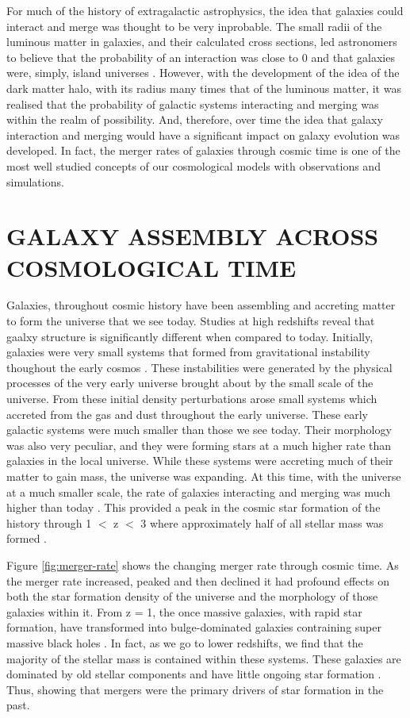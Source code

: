 For much of the history of extragalactic astrophysics, the idea that galaxies could interact and merge was thought to be very inprobable. The small radii of the luminous matter in galaxies, and their calculated cross sections, led astronomers to believe that the probability of an interaction was close to 0 and that galaxies were, simply, island universes  \citep{1926ApJ....64..321H}. However, with the development of the idea of the dark matter halo, with its radius many times that of the luminous matter, it was realised that the probability of galactic systems interacting and merging was within the realm of possibility. And, therefore, over time the idea that galaxy interaction and merging would have a significant impact on galaxy evolution was developed. In fact, the merger rates of galaxies through cosmic time is one of the most well studied concepts of our cosmological models with observations and simulations.

\section{GALAXY ASSEMBLY ACROSS COSMOLOGICAL TIME}
\noindent Galaxies, throughout cosmic history have been assembling and accreting matter to form the universe that we see today. Studies at high redshifts reveal that gaalxy structure is significantly different when compared to today. Initially, galaxies were very small systems that formed from gravitational instability thoughout the early cosmos \citep{1993MNRAS.262..627L}. These instabilities were generated by the physical processes of the very early universe brought about by the small scale of the universe. From these initial density perturbations arose small systems which accreted from the gas and dust throughout the early universe. These early galactic systems were much smaller than those we see today. Their morphology was also very peculiar, and they were forming stars at a much higher rate than galaxies in the local universe. While these systems were accreting much of their matter to gain mass, the universe was expanding. At this time, with the universe at a much smaller scale, the rate of galaxies interacting and merging was much higher than today \citep{2010ApJ...715..202H, 2011ApJ...742..103L}. This provided a peak in the cosmic star formation of the history through 1 $<$ z $<$ 3 where approximately half of all stellar mass was formed \citep{2005ApJ...625..621B}.

Figure \ref{fig:merger-rate} shows the changing merger rate through cosmic time. As the merger rate increased, peaked and then declined it had profound effects on both the star formation density of the universe and the morphology of those galaxies within it. From z = 1, the once massive galaxies, with rapid star formation, have transformed into bulge-dominated galaxies contraining super massive black holes \citep{2007ApJ...654..858B}. In fact, as we go to lower redshifts, we find that the majority of the stellar mass is contained within these systems. These galaxies are dominated by old stellar components and have little ongoing star formation \citep{2002AJ....124..646H, 2004ApJ...608..752B}. Thus, showing that mergers were the primary drivers of star formation in the past. 

